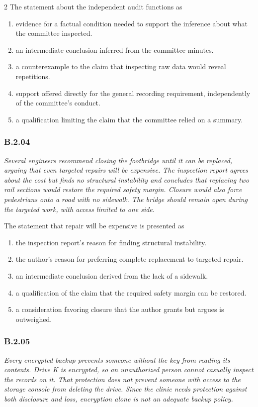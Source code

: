 \documentclass[10pt]{extarticle}
\newcommand{\choice}[1]{\item #1}
\newcommand{\bankitem}[1]{\subsubsection*{#1}}
\begin{document}
\begin{multicols}{2}
The statement about the independent audit functions as
\begin{enumerate}[label=(\alph*)]
  \choice{evidence for a factual condition needed to support the inference about what the committee inspected.}
  \choice{an intermediate conclusion inferred from the committee minutes.}
  \choice{a counterexample to the claim that inspecting raw data would reveal repetitions.}
  \choice{support offered directly for the general recording requirement, independently of the committee's conduct.}
  \choice{a qualification limiting the claim that the committee relied on a summary.}
\end{enumerate}
\bankitem{B.2.04}
\emph{Several engineers recommend closing the footbridge until it can be replaced, arguing that even targeted repairs will be expensive. The inspection report agrees about the cost but finds no structural instability and concludes that replacing two rail sections would restore the required safety margin. Closure would also force pedestrians onto a road with no sidewalk. The bridge should remain open during the targeted work, with access limited to one side.}

The statement that repair will be expensive is presented as
\begin{enumerate}[label=(\alph*)]
  \choice{the inspection report's reason for finding structural instability.}
  \choice{the author's reason for preferring complete replacement to targeted repair.}
  \choice{an intermediate conclusion derived from the lack of a sidewalk.}
  \choice{a qualification of the claim that the required safety margin can be restored.}
  \choice{a consideration favoring closure that the author grants but argues is outweighed.}
\end{enumerate}
\bankitem{B.2.05}
\emph{Every encrypted backup prevents someone without the key from reading its contents. Drive K is encrypted, so an unauthorized person cannot casually inspect the records on it. That protection does not prevent someone with access to the storage console from deleting the drive. Since the clinic needs protection against both disclosure and loss, encryption alone is not an adequate backup policy.}


\end{multicols}
\end{document}
